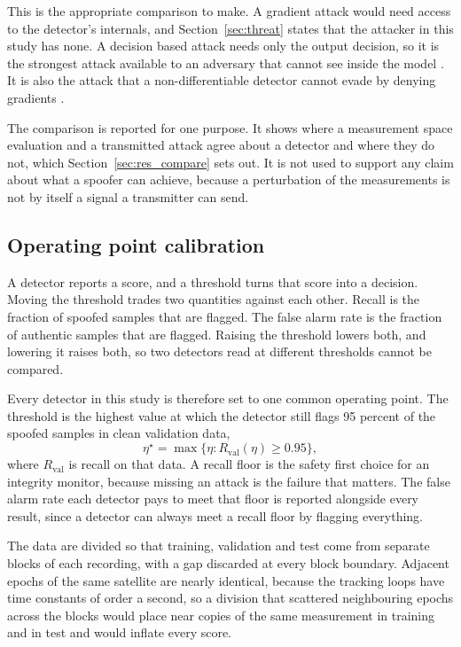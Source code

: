 \documentclass[pdflatex,sn-basic]{sn-jnl}
\theoremstyle{thmstyleone}
\theoremstyle{thmstyletwo}
\theoremstyle{thmstylethree}
\begin{document}
This is the appropriate comparison to make. A gradient attack would need access to the
detector's internals, and Section~\ref{sec:threat} states that the attacker in this study
has none. A decision based attack needs only the output decision, so it is the strongest
attack available to an adversary that cannot see inside the model
\citep{brendel2018decision,chen2020hopskipjump}. It is also the attack that a
non-differentiable detector cannot evade by denying gradients
\citep{athalye2018obfuscated}.

The comparison is reported for one purpose. It shows where a measurement space
evaluation and a transmitted attack agree about a detector and where they do not, which
Section~\ref{sec:res_compare} sets out. It is not used to support any claim about what a
spoofer can achieve, because a perturbation of the measurements is not by itself a signal
a transmitter can send.

\subsection{Operating point calibration}
\label{sec:oppoint}

A detector reports a score, and a threshold turns that score into a decision. Moving the
threshold trades two quantities against each other. Recall is the fraction of spoofed
samples that are flagged. The false alarm rate is the fraction of authentic samples that
are flagged. Raising the threshold lowers both, and lowering it raises both, so two
detectors read at different thresholds cannot be compared.

Every detector in this study is therefore set to one common operating point. The
threshold is the highest value at which the detector still flags 95 percent of the
spoofed samples in clean validation data,
\begin{equation}
\eta^\star = \max\{\eta : R_\mathrm{val}(\eta) \ge 0.95\},
\label{eq:oppoint}
\end{equation}
where $R_\mathrm{val}$ is recall on that data. A recall floor is the safety first choice
for an integrity monitor, because missing an attack is the failure that matters. The
false alarm rate each detector pays to meet that floor is reported alongside every
result, since a detector can always meet a recall floor by flagging everything.

The data are divided so that training, validation and test come from separate blocks of
each recording, with a gap discarded at every block boundary. Adjacent epochs of the same
satellite are nearly identical, because the tracking loops have time constants of order a
second, so a division that scattered neighbouring epochs across the blocks would place
near copies of the same measurement in training and in test and would inflate every
score.
\end{document}

